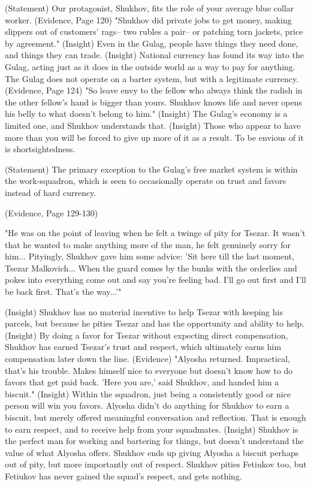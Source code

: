 \documentclass[12pt]{article}
\begin{document}
\begin{flushleft}
(Statement) Our protagonist, Shukhov, fits the role of your average blue collar worker.
(Evidence, Page 120) "Shukhov did private jobs to get money, making slippers out of customers' rags-- two rubles a pair-- or patching torn jackets, price by agreement."
(Insight) Even in the Gulag, people have things they need done, and things they can trade. 
(Insight) National currency has found its way into the Gulag, acting just as it does in the outside world as a way to pay for anything. The Gulag does not operate on a barter system, but with a legitimate currency.
(Evidence, Page 124) "So leave envy to the fellow who always think the radish in the other fellow's hand is bigger than yours. Shukhov knows life and never opens his belly to what doesn't belong to him."
(Insight) The Gulag's economy is a limited one, and Shukhov understands that. 
(Insight) Those who appear to have more than you will be forced to give up more of it as a result. To be envious of it is shortsightedness. 

(Statement) The primary exception to the Gulag's free market system is within the work-squadron, which is seen to occasionally operate on trust and favors instead of hard currency.

(Evidence, Page 129-130)
\begin{center}
"He was on the point of leaving when he felt a twinge of pity for Tsezar. 
It wasn't that he wanted to make anything more of the man, he felt genuinely sorry for him... Pityingly, Shukhov gave him some advice: 
'Sit here till the last moment, Tsezar Malkovich... 
When the guard comes by the bunks with the orderlies and pokes into everything come out and say you're feeling bad. 
I'll go out first and I'll be back first. That's the way...'"
\end{center}

(Insight) Shukhov has no material incentive to help Tsezar with keeping his parcels, but because he pities Tsezar and has the opportunity and ability to help.
(Insight) By doing a favor for Tsezar without expecting direct compensation, Shukhov has earned Tsezar's trust and respect, which ultimately earns him compensation later down the line. 
(Evidence) "Alyosha returned. Impractical, that's his trouble. Makes himself nice to everyone but doesn't know how to do favors that get paid back. 'Here you are,' said Shukhov, and handed him a biscuit."
(Insight) Within the squadron, just being a consistently good or nice person will win you favors. Alyosha didn't do anything for Shukhov to earn a biscuit, but merely offered meaningful conversation and reflection. That is enough to earn respect, and to receive help from your squadmates.
(Insight) Shukhov is the perfect man for working and bartering for things, but doesn't understand the value of what Alyosha offers. Shukhov ends up giving Alyosha a biscuit perhaps out of pity, but more importantly out of respect. Shukhov pities Fetiukov too, but Fetiukov has never gained the squad's respect, and gets nothing.



\end{flushleft}
\end{document}
